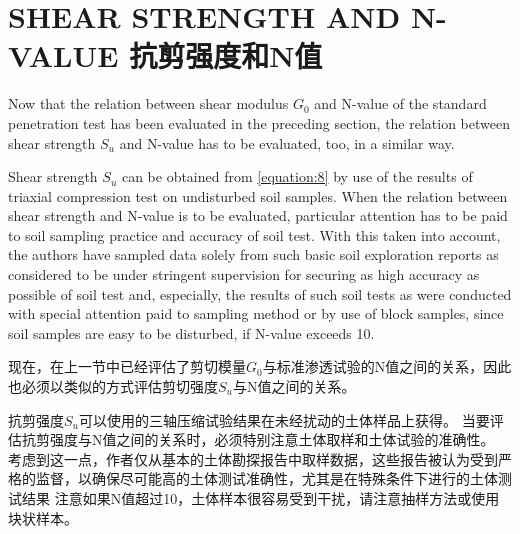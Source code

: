 \section{SHEAR STRENGTH AND N-VALUE 抗剪强度和N值}

\begin{paracol}{2}
    
    Now that the relation between shear modulus $G_0$ and N-value of the standard penetration test has been evaluated in the preceding section, the relation between shear strength $S_u$ and N-value has to be evaluated, too, in a similar way.

    Shear strength $S_u$ can be obtained from \autoref{equation:8} by use of the results of triaxial compression test on undisturbed soil samples. When the relation between shear strength and N-value is to be evaluated, particular attention has to be paid to soil sampling practice and accuracy of soil test. With this taken into account, the authors have sampled data solely from such basic soil exploration reports as considered to be under stringent supervision for securing as high accuracy as possible of soil test and, especially, the results of such soil tests as were conducted with special attention paid to sampling method\citep{Koizumi1968} or by use of block samples, since soil samples are easy to be disturbed, if N-value exceeds 10.

    \switchcolumn

    现在，在上一节中已经评估了剪切模量$G_0$与标准渗透试验的N值之间的关系，因此也必须以类似的方式评估剪切强度$S_u$与N值之间的关系。
        
    抗剪强度$S_u$可以使用的三轴压缩试验结果在未经扰动的土体样品上获得。 当要评估抗剪强度与N值之间的关系时，必须特别注意土体取样和土体试验的准确性。 考虑到这一点，作者仅从基本的土体勘探报告中取样数据，这些报告被认为受到严格的监督，以确保尽可能高的土体测试准确性，尤其是在特殊条件下进行的土体测试结果 注意如果N值超过10，土体样本很容易受到干扰，请注意抽样方法\citep{Koizumi1968}或使用块状样本。

\end{paracol}


